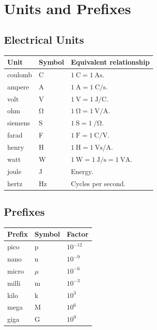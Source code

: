 \chapter{Units and Prefixes}
\section{Electrical Units}
\begin{tabularx}{\textwidth}{@{}L{0.22\textwidth}L{0.18\textwidth}Y@{}}
\toprule
Unit & Symbol & Equivalent relationship \\
\midrule
coulomb & \si{\coulomb} & \(\SI{1}{\coulomb}=\SI{1}{\ampere\second}\). \\
ampere & \si{\ampere} & \(\SI{1}{\ampere}=\SI{1}{\coulomb\per\second}\). \\
volt & \si{\volt} & \(\SI{1}{\volt}=\SI{1}{\joule\per\coulomb}\). \\
ohm & \si{\ohm} & \(\SI{1}{\ohm}=\SI{1}{\volt\per\ampere}\). \\
siemens & \si{\siemens} & \(\SI{1}{\siemens}=\SI{1}{\per\ohm}\). \\
farad & \si{\farad} & \(\SI{1}{\farad}=\SI{1}{\coulomb\per\volt}\). \\
henry & \si{\henry} & \(\SI{1}{\henry}=\SI{1}{\volt\second\per\ampere}\). \\
watt & \si{\watt} & \(\SI{1}{\watt}=\SI{1}{\joule\per\second}=\SI{1}{\volt\ampere}\). \\
joule & \si{\joule} & Energy. \\
hertz & \si{\hertz} & Cycles per second. \\
\bottomrule
\end{tabularx}

\section{Prefixes}
\begin{center}
\begin{tabular}{@{}lll@{}}
\toprule
Prefix & Symbol & Factor \\
\midrule
pico & p & \(10^{-12}\) \\
nano & n & \(10^{-9}\) \\
micro & \(\mu\) & \(10^{-6}\) \\
milli & m & \(10^{-3}\) \\
kilo & k & \(10^{3}\) \\
mega & M & \(10^{6}\) \\
giga & G & \(10^{9}\) \\
\bottomrule
\end{tabular}
\end{center}
